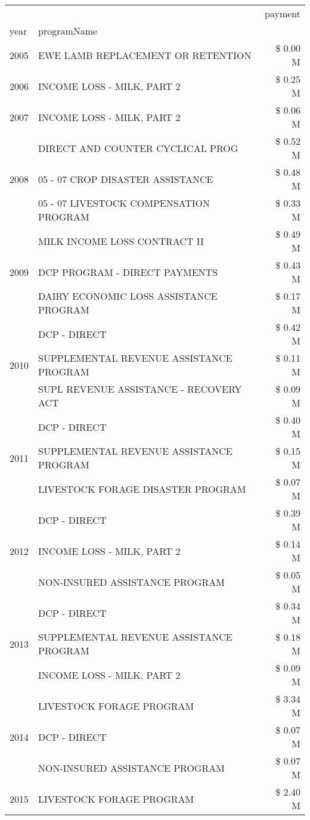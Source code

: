 \begin{tabular}{llr}
\toprule
 &  & payment \\
year & programName &  \\
\midrule
2005 & EWE LAMB REPLACEMENT OR RETENTION & \$ 0.00 M \\
\cline{1-3}
2006 & INCOME LOSS - MILK, PART 2 & \$ 0.25 M \\
\cline{1-3}
2007 & INCOME LOSS - MILK, PART 2 & \$ 0.06 M \\
\cline{1-3}
\multirow[t]{3}{*}{2008} & DIRECT AND COUNTER CYCLICAL PROG & \$ 0.52 M \\
 & 05 - 07 CROP DISASTER ASSISTANCE & \$ 0.48 M \\
 & 05 - 07 LIVESTOCK COMPENSATION PROGRAM & \$ 0.33 M \\
\cline{1-3}
\multirow[t]{3}{*}{2009} & MILK INCOME LOSS CONTRACT II & \$ 0.49 M \\
 & DCP PROGRAM - DIRECT PAYMENTS & \$ 0.43 M \\
 & DAIRY ECONOMIC LOSS ASSISTANCE PROGRAM & \$ 0.17 M \\
\cline{1-3}
\multirow[t]{3}{*}{2010} & DCP - DIRECT & \$ 0.42 M \\
 & SUPPLEMENTAL REVENUE ASSISTANCE PROGRAM & \$ 0.11 M \\
 & SUPL REVENUE ASSISTANCE - RECOVERY ACT & \$ 0.09 M \\
\cline{1-3}
\multirow[t]{3}{*}{2011} & DCP - DIRECT & \$ 0.40 M \\
 & SUPPLEMENTAL REVENUE ASSISTANCE PROGRAM & \$ 0.15 M \\
 & LIVESTOCK FORAGE DISASTER PROGRAM & \$ 0.07 M \\
\cline{1-3}
\multirow[t]{3}{*}{2012} & DCP - DIRECT & \$ 0.39 M \\
 & INCOME LOSS - MILK, PART 2 & \$ 0.14 M \\
 & NON-INSURED ASSISTANCE PROGRAM & \$ 0.05 M \\
\cline{1-3}
\multirow[t]{3}{*}{2013} & DCP - DIRECT & \$ 0.34 M \\
 & SUPPLEMENTAL REVENUE ASSISTANCE PROGRAM & \$ 0.18 M \\
 & INCOME LOSS - MILK, PART 2 & \$ 0.09 M \\
\cline{1-3}
\multirow[t]{3}{*}{2014} & LIVESTOCK FORAGE PROGRAM & \$ 3.34 M \\
 & DCP - DIRECT & \$ 0.07 M \\
 & NON-INSURED ASSISTANCE PROGRAM & \$ 0.07 M \\
\cline{1-3}
\multirow[t]{3}{*}{2015} & LIVESTOCK FORAGE PROGRAM & \$ 2.40 M \\

\end{tabular}
